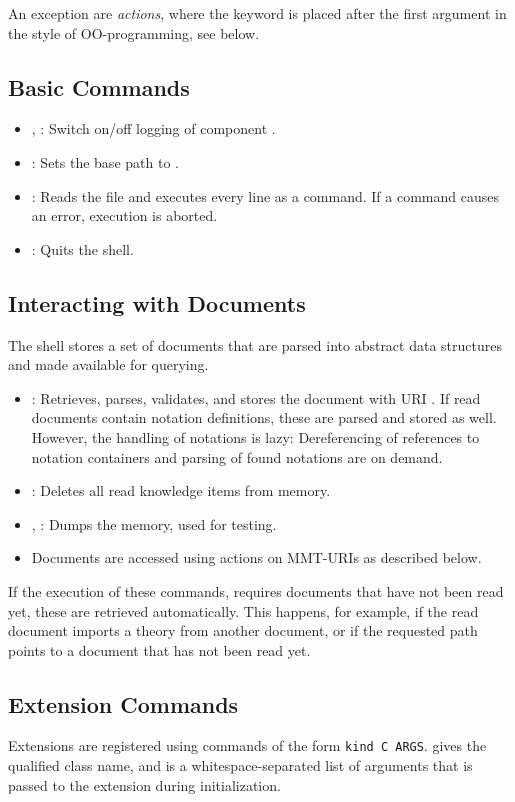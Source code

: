 An exception are \emph{actions}, where the keyword is placed after the first argument in the style of OO-programming, see below.

\subsection{Basic Commands}\label{sec:shell:basic}
\begin{itemize}
\item {},  : Switch on/off logging of component .
\item {}: Sets the base path to .
\item {}: Reads the file  and executes every line as a command. If a command causes an error, execution is aborted.
\item {}: Quits the shell.
\end{itemize}

\subsection{Interacting with Documents}\label{sec:shell:interact}
The shell stores a set of documents that are parsed into abstract data structures and made available for querying.

\begin{itemize}
\item {}: Retrieves, parses, validates, and stores the document with URI . If read documents contain notation definitions, these are parsed and stored as well. However, the handling of notations is lazy: Dereferencing of references to notation containers and parsing of found notations are on demand.
\item {}: Deletes all read knowledge items from memory.
\item {}, : Dumps the memory, used for testing.
\item Documents are accessed using actions on MMT-URIs as described below.
\end{itemize}
If the execution of these commands, requires documents that have not been read yet, these are retrieved automatically. This happens, for example, if the read document imports a theory from another document, or if the requested path points to a document that has not been read yet.

\subsection{Extension Commands}\label{sec:shell:extensions}
Extensions are registered using commands of the form \texttt{kind C ARGS}.  gives the qualified class name, and  is a whitespace-separated list of arguments that is passed to the extension during initialization.

